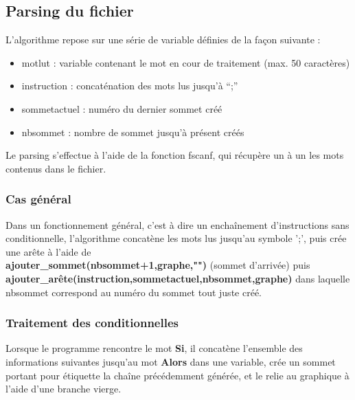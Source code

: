 \documentclass[a4paper,11pt]{article}
\begin{document}
		\subsection{Parsing du fichier}
		L'algorithme repose sur une série de variable définies de la façon suivante :
		\begin{itemize}
		\item motlut : variable contenant le mot en cour de traitement (max. 50 caractères)
		\item instruction : concaténation des mots lus jusqu'à ``;''
		\item sommetactuel : numéro du dernier sommet créé
		\item nbsommet : nombre de sommet jusqu'à présent créés
		\end{itemize}
		Le parsing s'effectue à l'aide de la fonction fscanf, qui récupère un à un les mots contenus dans le fichier.
		\subsubsection{Cas général}
		Dans un fonctionnement général, c'est à dire un enchaînement d'instructions sans conditionnelle, l'algorithme concatène les mots lus jusqu'au symbole ';', puis crée une arête à l'aide de \\\textbf{ajouter\_sommet(nbsommet+1,graphe,"")} (sommet d'arrivée) puis \\\textbf{ajouter\_arête(instruction,sommetactuel,nbsommet,graphe)} dans laquelle nbsommet correspond au numéro du sommet tout juste créé.
		\subsubsection{Traitement des conditionnelles}
		Lorsque le programme rencontre le mot \textbf{Si}, il concatène l'ensemble des informations suivantes jusqu'au mot \textbf{Alors} dans une variable, crée un sommet portant pour étiquette la chaîne précédemment générée, et le relie au graphique à l'aide d'une branche vierge.
		
\end{document}
